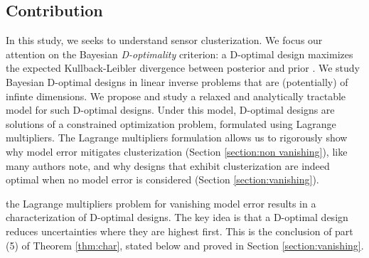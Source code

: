 \subsection{Contribution}
In this study, we seeks to understand sensor clusterization. We focus
our attention on the Bayesian \emph{D-optimality} criterion: a
D-optimal design maximizes the expected Kullback-Leibler divergence
\cite{CoverThomas91} between posterior and prior
\cite{Chaloner1995}. We study Bayesian D-optimal designs in linear
inverse problems that are (potentially) of infinte dimensions. We
propose and study a relaxed and analytically tractable model for such
D-optimal designs. Under this model, D-optimal designs are solutions
of a constrained optimization problem, formulated using Lagrange
multipliers. The Lagrange multipliers formulation allows us to
rigorously show why model error mitigates clusterization (Section
\ref{section:non vanishing}), like many authors note, and why designs
that exhibit clusterization are indeed optimal when no model error is
considered (Section \ref{section:vanishing}).

the Lagrange multipliers problem for vanishing model error results in
a characterization of D-optimal designs. The key idea is that a
D-optimal design reduces uncertainties where they are highest
first. This is the conclusion of part (5) of Theorem \ref{thm:char},
stated below and proved in Section \ref{section:vanishing}.

